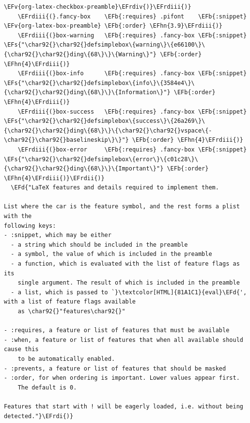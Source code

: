 \documentclass{scrartcl}
\newcommand{\EFd}[1]{\textcolor{EFd}{#1}} %
\newcommand{\EFs}[1]{\textcolor{EFs}{#1}} %
\newcommand{\EFb}[1]{\textcolor{EFb}{#1}} %
\newcommand{\EFv}[1]{\textcolor{EFv}{#1}} %
\newcommand{\EFhn}[1]{#1} %
\newcommand{\EFrdi}[1]{#1} %
\newcommand{\EFrdii}[1]{#1} %
\newcommand{\EFrdiii}[1]{#1} %
\newcommand{\EFrdiv}[1]{#1} %
\begin{document}
\begin{Code}
\begin{Verbatim}[]
                                    \EFv{org-latex-checkbox-preamble}\EFrdiv{)}\EFrdiii{)}
    \EFrdiii{(}.fancy-box    \EFb{:requires} .pifont    \EFb{:snippet} \EFv{org-latex-box-preamble} \EFb{:order} \EFhn{3.9}\EFrdiii{)}
    \EFrdiii{(}box-warning   \EFb{:requires} .fancy-box \EFb{:snippet} \EFs{"\char92{}\char92{}defsimplebox\{warning\}\{e66100\}\{\char92{}\char92{}ding\{68\}\}\{Warning\}"} \EFb{:order} \EFhn{4}\EFrdiii{)}
    \EFrdiii{(}box-info      \EFb{:requires} .fancy-box \EFb{:snippet} \EFs{"\char92{}\char92{}defsimplebox\{info\}\{3584e4\}\{\char92{}\char92{}ding\{68\}\}\{Information\}"} \EFb{:order} \EFhn{4}\EFrdiii{)}
    \EFrdiii{(}box-success   \EFb{:requires} .fancy-box \EFb{:snippet} \EFs{"\char92{}\char92{}defsimplebox\{success\}\{26a269\}\{\char92{}\char92{}ding\{68\}\}\{\char92{}\char92{}vspace\{-\char92{}\char92{}baselineskip\}\}"} \EFb{:order} \EFhn{4}\EFrdiii{)}
    \EFrdiii{(}box-error     \EFb{:requires} .fancy-box \EFb{:snippet} \EFs{"\char92{}\char92{}defsimplebox\{error\}\{c01c28\}\{\char92{}\char92{}ding\{68\}\}\{Important\}"} \EFb{:order} \EFhn{4}\EFrdiii{)}\EFrdii{)}
  \EFd{"LaTeX features and details required to implement them.

List where the car is the feature symbol, and the rest forms a plist with the
following keys:
- :snippet, which may be either
  - a string which should be included in the preamble
  - a symbol, the value of which is included in the preamble
  - a function, which is evaluated with the list of feature flags as its
    single argument. The result of which is included in the preamble
  - a list, which is passed to `}\textcolor[HTML]{81A1C1}{eval}\EFd{', with a list of feature flags available
    as \char92{}"features\char92{}"

- :requires, a feature or list of features that must be available
- :when, a feature or list of features that when all available should cause this
    to be automatically enabled.
- :prevents, a feature or list of features that should be masked
- :order, for when ordering is important. Lower values appear first.
    The default is 0.

Features that start with ! will be eagerly loaded, i.e. without being detected."}\EFrdi{)}
\end{Verbatim}
\end{Code}
\end{document}
